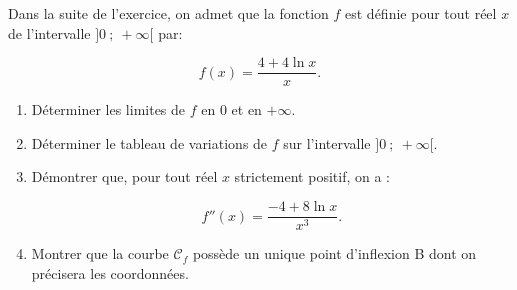 \documentclass[11pt]{article}
\begin{document}
Dans la suite de l'exercice, on admet que la fonction $f$ est définie pour tout réel $x$ de l'intervalle $]0~;~ +\infty[$ par:

\[f(x) = \dfrac{4 + 4\ln x}{x}.\]

\begin{enumerate}[resume]
\item Déterminer les limites de $f$ en $0$ et en $+\infty$.
\item Déterminer le tableau de variations de $f$ sur l'intervalle $]0~;~ +\infty[$. 
\item Démontrer que, pour tout réel $x$ strictement positif, on a :

\[f''(x) = \dfrac{- 4 + 8\ln x}{x^3}.\]

\item Montrer que la courbe $\mathcal{C}_f$ possède un unique point d'inflexion B dont on précisera les coordonnées.
\end{enumerate}
\end{document}
